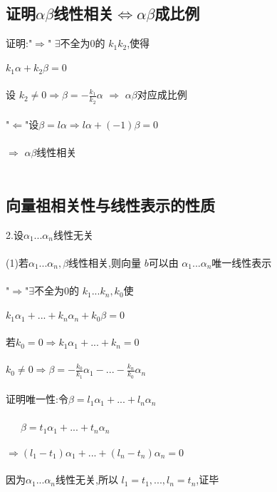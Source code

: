 \documentclass[a4paper,fleqn]{article}
\begin{document}
\subsection{证明$\alpha \beta$线性相关$\Leftrightarrow \alpha \beta$成比例}
证明:"$\Rightarrow$" $\exists$不全为0的 $k_1k_2$,使得 \\ \\
 $k_1\alpha+k_2\beta=0$ \\ \\
 设  $k_2\neq0 \Rightarrow \beta = - \frac{k_1}{k_2}\alpha$ $\Rightarrow$ $\alpha\beta$对应成比例 \\ \\
 "$\Leftarrow$"设$\beta=l\alpha \Rightarrow l\alpha+(-1)\beta=0$ \\ \\
  $\Rightarrow$  $\alpha \beta$线性相关 \\ \\
\subsection{向量祖相关性与线性表示的性质}
2.设$\alpha_1...\alpha_n$线性无关 \\ \\
(1)若$\alpha_1...\alpha_n,\beta$线性相关,则向量 $b$可以由 $\alpha_1...\alpha_n$唯一线性表示 \\ \\
"$\Rightarrow$"$\exists$不全为0的 $k_1...k_n,k_0$使 \\ \\
 $k_1\alpha_1+...+k_n\alpha_n+k_0\beta=0$ \\ \\
若$k_0=0\Rightarrow k_1\alpha_1+...+k_n=0$\\ \\
$k_0 \neq 0 \Rightarrow \beta=-\frac{k_0}{k_1}\alpha_1-...-\frac{k_n}{k_0}\alpha_n$ \\ \\

证明唯一性:令$\beta=l_1\alpha_1+...+l_n\alpha_n$ \\ \\ 
\ \ \ $\beta=t_1\alpha_1+...+t_n\alpha_n$ \\ \\
$\Rightarrow (l_1-t_1)\alpha_1+...+(l_n-t_n)\alpha_n=0$ \\ \\
因为$\alpha_1...\alpha_n$线性无关,所以  $l_1=t_1,...,l_n=t_n$,证毕 \\ \\
\end{document}
